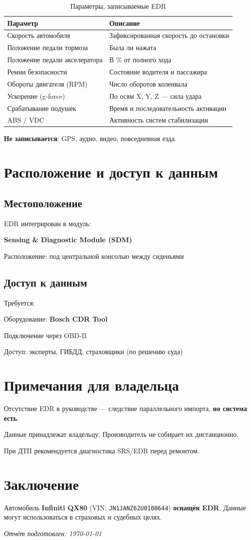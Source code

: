 \documentclass[12pt]{article}
\begin{document}
\begin{table}[h]
\centering
\caption{Параметры, записываемые EDR}
\begin{tabularx}{\textwidth}{lX}
    \toprule
    \textbf{Параметр} & \textbf{Описание} \\
    \midrule
    Скорость автомобиля & Зафиксированная скорость до остановки \\
    Положение педали тормоза & Была ли нажата \\
    Положение педали акселератора & В \% от полного хода \\
    Ремни безопасности & Состояние водителя и пассажира \\
    Обороты двигателя (RPM) & Число оборотов коленвала \\
    Ускорение (g-force) & По осям X, Y, Z — сила удара \\
    Срабатывание подушек & Время и последовательность активации \\
    ABS / VDC & Активность систем стабилизации \\
    \bottomrule
\end{tabularx}
\end{table}

\textbf{Не записывается}: GPS, аудио, видео, повседневная езда.

\section{Расположение и доступ к данным}
\subsection*{Местоположение}
EDR интегрирован в модуль:
\item \textbf{Sensing \& Diagnostic Module (SDM)}
    \item Расположение: под центральной консолью между сиденьями

\subsection*{Доступ к данным}
Требуется:
\item Оборудование: \textbf{Bosch CDR Tool}
    \item Подключение через OBD-II
    \item Доступ: эксперты, ГИБДД, страховщики (по решению суда)

\section{Примечания для владельца}
\item Отсутствие EDR в руководстве — следствие параллельного импорта, \textbf{но система есть}.
    \item Данные принадлежат владельцу. Производитель не собирает их дистанционно.
    \item При ДТП рекомендуется диагностика SRS/EDR перед ремонтом.

\section*{Заключение}
Автомобиль \textbf{Infiniti QX80} (VIN: \texttt{JN1JANZ62U0100644}) \textbf{оснащён EDR}. Данные могут использоваться в страховых и судебных целях.

\vspace{1cm}
\begin{flushright}
    \textit{Отчёт подготовлен: \today}
\end{flushright}
\end{document}
